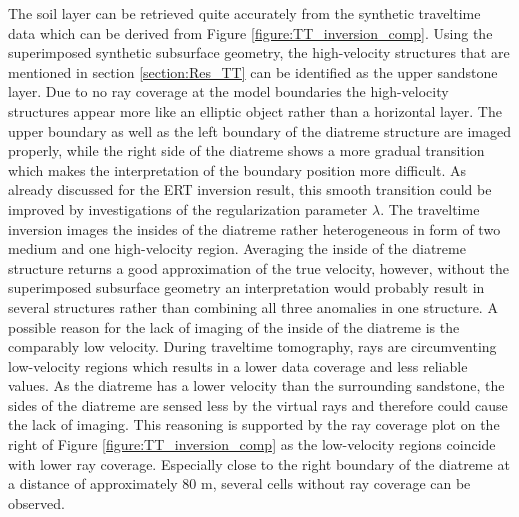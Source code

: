 The soil layer can be retrieved quite accurately from the synthetic traveltime data which can be derived from Figure \ref{figure:TT_inversion_comp}. Using the superimposed synthetic subsurface geometry, the high-velocity structures that are mentioned in section \ref{section:Res_TT} can be identified as the upper sandstone layer. Due to no ray coverage at the model boundaries the high-velocity structures appear more like an elliptic object rather than a horizontal layer. The upper boundary as well as the left boundary of the diatreme structure are imaged properly, while the right side of the diatreme shows a more gradual transition which makes the interpretation of the boundary position more difficult. As already discussed for the ERT inversion result, this smooth transition could be improved by investigations of the regularization parameter $\lambda$. The traveltime inversion images the insides of the diatreme rather heterogeneous in form of two medium and one high-velocity region. Averaging the inside of the diatreme structure returns a good approximation of the true velocity, however, without the superimposed subsurface geometry an interpretation would probably result in several structures rather than combining all three anomalies in one structure. A possible reason for the lack of imaging of the inside of the diatreme is the comparably low velocity. During traveltime tomography, rays are  circumventing low-velocity regions which results in a lower data coverage and less reliable values. As the diatreme has a lower velocity than the surrounding sandstone, the sides of the diatreme are sensed less by the virtual rays and therefore could cause the lack of imaging. This reasoning is supported by the ray coverage plot on the right of Figure \ref{figure:TT_inversion_comp} as the low-velocity regions coincide with lower ray coverage. Especially close to the right boundary of the diatreme at a distance of approximately 80 m, several cells without ray coverage can be observed. 

